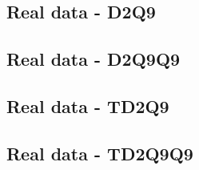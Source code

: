 \documentclass[class=article, crop=false]{standalone}
\begin{document}
\subsection{Real data - D2Q9}

\subsection{Real data - D2Q9Q9}

\subsection{Real data - TD2Q9}

\subsection{Real data - TD2Q9Q9}
\end{document}
